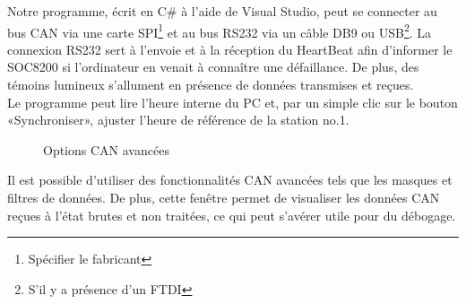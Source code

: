 \documentclass[10pt,a4paper,final]{article}
\begin{document}
\begin{spacing}{1.5}
Notre programme, écrit en C\# à l'aide de Visual Studio, peut se connecter au bus CAN via une carte SPI\footnote{Spécifier le fabricant} et au bus RS232 via un câble DB9 ou USB\footnote{S'il y a présence d'un FTDI}. La connexion RS232 sert à l'envoie et à la réception du HeartBeat afin d'informer le SOC8200 si l'ordinateur en venait à connaître une défaillance. De plus, des témoins lumineux s'allument en présence de données transmises et reçues. \\
Le programme peut lire l'heure interne du PC et, par un simple clic sur le bouton «Synchroniser», ajuster l'heure de référence de la station no.1.\\
\vfill
\pagebreak





\begin{figure}[hbtp]
\caption{Options CAN avancées}
\centering
{}
\end{figure}
Il est possible d'utiliser des fonctionnalités CAN avancées tels que les masques et filtres de données. De plus, cette fenêtre permet de visualiser les données CAN reçues à l'état brutes et non traitées, ce qui peut s'avérer utile pour du débogage.



\end{spacing}
\end{document}
